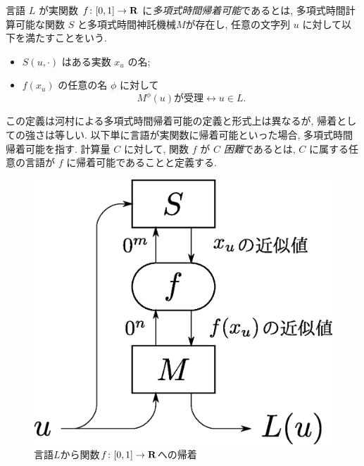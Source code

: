  \begin{definition}[多項式時間帰着可能]
  言語 $L$ が実関数 $f\colon [0,1] \to \mathbf R$ に\emph{多項式時間帰着可能}であるとは, 
  多項式時間計算可能な関数 $S$ と多項式時間神託機械$M$が存在し, 
  任意の文字列 $u$ に対して以下を満たすことをいう. 
  \begin{itemize}
   \item $S(u, \cdot)$ はある実数 $x_u$ の名;
   \item $f(x_u)$ の任意の名 $\phi$ に対して
	 \[
	  M^\phi(u) \text{が受理} \leftrightarrow u \in L.
	 \]
  \end{itemize}
 \end{definition}
 この定義は河村による多項式時間帰着可能の定義と形式上は異なるが,
 帰着としての強さは等しい.
 以下単に言語が実関数に帰着可能といった場合, 多項式時間帰着可能を指す.
 計算量 $C$ に対して, 関数 $f$ が \emph{$C$ 困難}であるとは,
 $C$ に属する任意の言語が $f$ に帰着可能であることと定義する.

 \begin{figure}
  \begin{center}
  \includegraphics[scale=0.25]{image/reduction.eps}
  \caption{言語$L$から関数$f \colon [0,1] \to \mathbf R$への帰着}
  \label{fig:reduction}
  \end{center}
 \end{figure}
